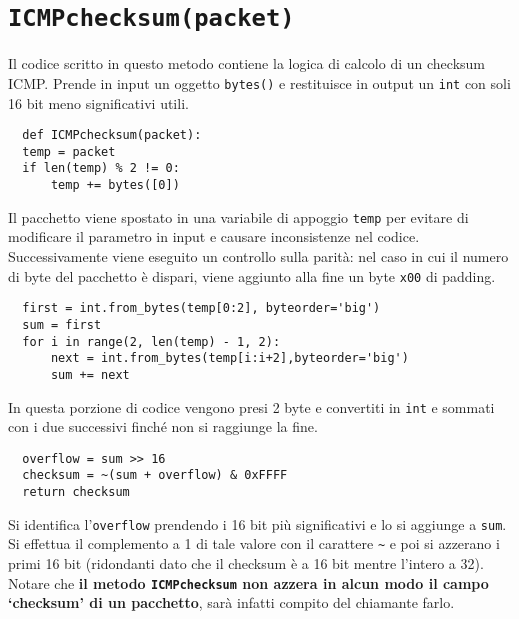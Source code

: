 \documentclass[a4paper,12pt]{report}
\begin{document}
\section{\texttt{ICMPchecksum(packet)}}
Il codice scritto in questo metodo contiene la logica di calcolo di un checksum ICMP.
%
Prende in input un oggetto \texttt{bytes()} e restituisce in output un \texttt{int} con soli 16 bit meno significativi utili.
%
\begin{verbatim}
  def ICMPchecksum(packet):
  temp = packet
  if len(temp) % 2 != 0:
      temp += bytes([0])
\end{verbatim}
Il pacchetto viene spostato in una variabile di appoggio \texttt{temp} per evitare di modificare il parametro in input e causare inconsistenze nel codice.
%
\\ Successivamente viene eseguito un controllo sulla parità: nel caso in cui il numero di byte del pacchetto è dispari, viene aggiunto alla fine un byte \texttt{x00} di padding.
\begin{verbatim}
  first = int.from_bytes(temp[0:2], byteorder='big')
  sum = first
  for i in range(2, len(temp) - 1, 2):
      next = int.from_bytes(temp[i:i+2],byteorder='big')
      sum += next
\end{verbatim}
In questa porzione di codice vengono presi 2 byte e convertiti in \texttt{int} e sommati con i due successivi finché non si raggiunge la fine.
\begin{verbatim}
  overflow = sum >> 16
  checksum = ~(sum + overflow) & 0xFFFF
  return checksum
\end{verbatim}
Si identifica l'\texttt{overflow} prendendo i 16 bit più significativi e lo si aggiunge a \texttt{sum}. Si effettua il complemento a 1 di tale valore con il carattere \texttt{\~} e poi si azzerano i primi 16 bit (ridondanti dato che il checksum è a 16 bit mentre l'intero a 32).
%
\\ Notare che \textbf{il metodo \texttt{ICMPchecksum} non azzera in alcun modo il campo `checksum' di un pacchetto}, sarà infatti compito del chiamante farlo.
\end{document}
